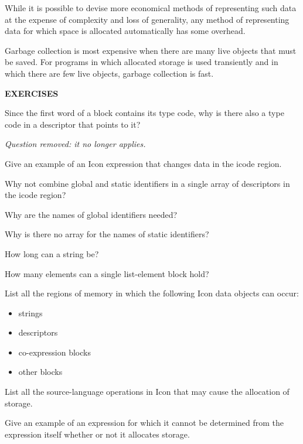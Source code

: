 While it is possible to devise more economical methods of representing
such data at the expense of complexity and loss of generality, any
method of representing data for which space is allocated automatically
has some overhead.

Garbage collection is most expensive when there are many live objects
that must be saved. For programs in which allocated storage is used
transiently and in which there are few live objects, garbage
collection is fast.

\bigskip

\noindent\textbf{EXERCISES}

 Since the first word of a block contains its type
code, why is there also a type code in a descriptor that points to it?

{\em Question removed: it no longer applies.}

 Give an example of an Icon expression that
changes data in the icode region.

 Why not combine global and static identifiers in
a single array of descriptors in the icode region?

 Why are the names of global identifiers needed?

 Why is there no array for the names of static identifiers?

 How long can a string be?

 How many elements can a single list-element block
hold?

 List all the regions of memory in which the
following Icon data objects can occur:
\begin{itemize}
\item 
strings
\item 
descriptors
\item 
co-expression blocks
\item 
other blocks
\end{itemize}

 List all the source-language operations in Icon
that may cause the allocation of storage.

 Give an example of an expression for which it
cannot be determined from the expression itself whether or not it
allocates storage.

